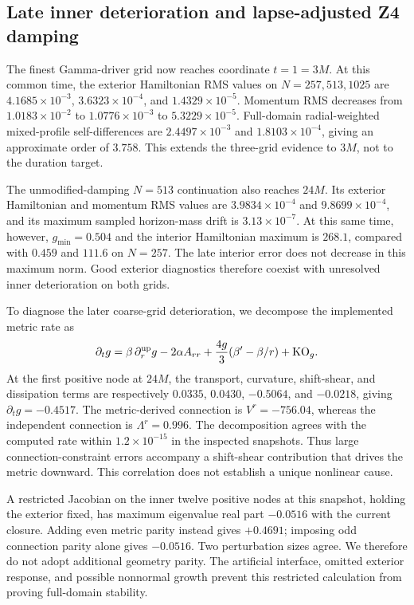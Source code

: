 \documentclass[11pt]{article}
\begin{document}
\subsection{Late inner deterioration and lapse-adjusted Z4 damping}
The finest Gamma-driver grid now reaches coordinate $t=1=3M$. At this common time, the exterior Hamiltonian RMS values on $N=257,513,1025$ are $4.1685\times10^{-3}$, $3.6323\times10^{-4}$, and $1.4329\times10^{-5}$. Momentum RMS decreases from $1.0183\times10^{-2}$ to $1.0776\times10^{-3}$ to $5.3229\times10^{-5}$. Full-domain radial-weighted mixed-profile self-differences are $2.4497\times10^{-3}$ and $1.8103\times10^{-4}$, giving an approximate order of $3.758$. This extends the three-grid evidence to $3M$, not to the duration target.

The unmodified-damping $N=513$ continuation also reaches $24M$. Its exterior Hamiltonian and momentum RMS values are $3.9834\times10^{-4}$ and $9.8699\times10^{-4}$, and its maximum sampled horizon-mass drift is $3.13\times10^{-7}$. At this same time, however, $g_{\min}=0.504$ and the interior Hamiltonian maximum is $268.1$, compared with $0.459$ and $111.6$ on $N=257$. The late interior error does not decrease in this maximum norm. Good exterior diagnostics therefore coexist with unresolved inner deterioration on both grids.

To diagnose the later coarse-grid deterioration, we decompose the implemented metric rate as
\begin{equation}
 \partial_t g=\beta\,\partial_r^{\rm up}g-2\alpha A_{rr}
       +\frac{4g}{3}(\beta'-\beta/r)+\mathrm{KO}_g.
\end{equation}
At the first positive node at $24M$, the transport, curvature, shift-shear, and dissipation terms are respectively $0.0335$, $0.0430$, $-0.5064$, and $-0.0218$, giving $\partial_tg=-0.4517$. The metric-derived connection is $V^r=-756.04$, whereas the independent connection is $\Lambda^r=0.996$. The decomposition agrees with the computed rate within $1.2\times10^{-15}$ in the inspected snapshots. Thus large connection-constraint errors accompany a shift-shear contribution that drives the metric downward. This correlation does not establish a unique nonlinear cause.

A restricted Jacobian on the inner twelve positive nodes at this snapshot, holding the exterior fixed, has maximum eigenvalue real part $-0.0516$ with the current closure. Adding even metric parity instead gives $+0.4691$; imposing odd connection parity alone gives $-0.0516$. Two perturbation sizes agree. We therefore do not adopt additional geometry parity. The artificial interface, omitted exterior response, and possible nonnormal growth prevent this restricted calculation from proving full-domain stability.
\end{document}
